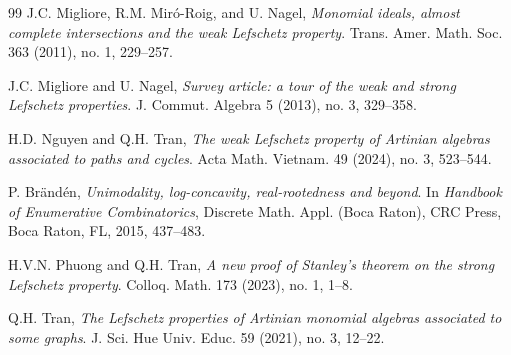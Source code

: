 \documentclass[12pt,twoside]{amsart}
\theoremstyle{definition}
\theoremstyle{mystyle}
\begin{document}
\begin{thebibliography}{99}
	J.C. Migliore, R.M. Mir\'o-Roig, and U. Nagel,
	\emph{Monomial ideals, almost complete intersections and the weak Lefschetz property}.
	Trans. Amer. Math. Soc. 363 (2011), no. 1, 229--257.
	
	J.C. Migliore and U. Nagel,
	\emph{Survey article: a tour of the weak and strong Lefschetz properties}.
	J. Commut. Algebra 5 (2013), no. 3, 329--358.
	
	
	
	H.D. Nguyen and Q.H. Tran,
	\emph{The weak Lefschetz property of Artinian algebras associated to paths and cycles}.
	Acta Math. Vietnam. 49 (2024), no. 3, 523--544.
	
	

	P. Br\"and\'en,
	\emph{Unimodality, log-concavity, real-rootedness and beyond}.
	In \emph{Handbook of Enumerative Combinatorics},
	Discrete Math. Appl. (Boca Raton),
	CRC Press, Boca Raton, FL, 2015, 437--483.

	H.V.N. Phuong and Q.H. Tran,
	\emph{A new proof of Stanley's theorem on the strong Lefschetz property}.
	Colloq. Math. 173 (2023), no. 1, 1--8.
	
	Q.H. Tran,
	\emph{The Lefschetz properties of Artinian monomial algebras associated to some graphs}.
	J. Sci. Hue Univ. Educ. 59 (2021), no. 3, 12--22.
	
	
\end{thebibliography}
\end{document}
